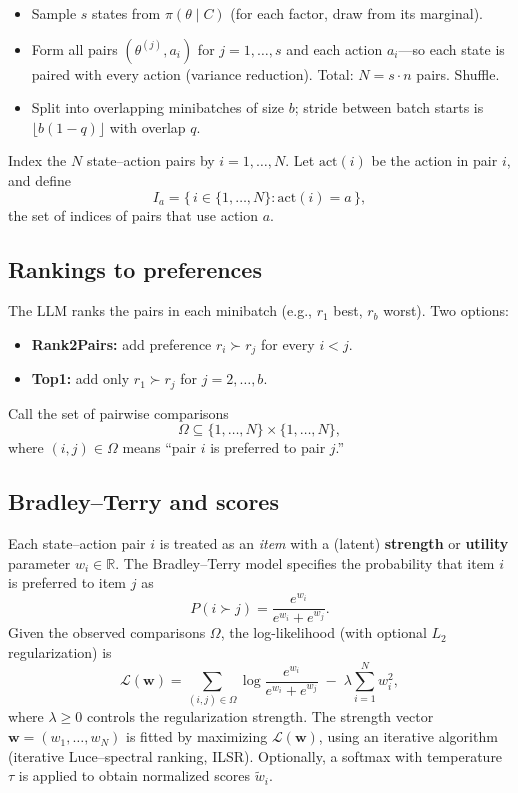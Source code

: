 \documentclass[11pt]{article}
\begin{document}
\begin{itemize}[leftmargin=*]
\item Sample $s$ states from $\pi(\theta\mid C)$ (for each factor, draw from its marginal).
\item Form all pairs $(\theta^{(j)}, a_i)$ for $j=1,\ldots,s$ and each action $a_i$---so each state is paired with every action (variance reduction). Total: $N = s \cdot n$ pairs. Shuffle.
\item Split into overlapping minibatches of size $b$; stride between batch starts is $\lfloor b(1-q) \rfloor$ with overlap $q$.
\end{itemize}

Index the $N$ state--action pairs by $i = 1,\ldots,N$. Let $\text{act}(i)$ be the action in pair $i$, and define
\[
I_a = \{\, i \in \{1,\ldots,N\} : \text{act}(i) = a \,\},
\]
the set of indices of pairs that use action $a$.

\subsection{Rankings to preferences}

The LLM ranks the pairs in each minibatch (e.g., $r_1$ best, $r_b$ worst). Two options:
\begin{itemize}[leftmargin=*]
\item \textbf{Rank2Pairs:} add preference $r_i \succ r_j$ for every $i < j$.
\item \textbf{Top1:} add only $r_1 \succ r_j$ for $j=2,\ldots,b$.
\end{itemize}
Call the set of pairwise comparisons
\[
\Omega \subseteq \{1,\ldots,N\} \times \{1,\ldots,N\},
\]
where $(i,j) \in \Omega$ means ``pair $i$ is preferred to pair $j$.''

\subsection{Bradley--Terry and scores}

Each state--action pair $i$ is treated as an \emph{item} with a (latent) \textbf{strength} or \textbf{utility} parameter $w_i \in \mathbb{R}$. The Bradley--Terry model specifies the probability that item $i$ is preferred to item $j$ as
\begin{equation}\label{eq:BT}
P(i \succ j) = \frac{e^{w_i}}{e^{w_i} + e^{w_j}}.
\end{equation}
Given the observed comparisons $\Omega$, the log-likelihood (with optional $L_2$ regularization) is
\begin{equation}\label{eq:BT_ll}
\mathcal{L}(\mathbf{w})
= \sum_{(i,j) \in \Omega} \log \frac{e^{w_i}}{e^{w_i} + e^{w_j}}
 \;-\; \lambda \sum_{i=1}^{N} w_i^2,
\end{equation}
where $\lambda \ge 0$ controls the regularization strength. The strength vector $\mathbf{w} = (w_1,\ldots,w_N)$ is fitted by maximizing $\mathcal{L}(\mathbf{w})$, using an iterative algorithm (iterative Luce--spectral ranking, ILSR). Optionally, a softmax with temperature $\tau$ is applied to obtain normalized scores $\tilde{w}_i$.
\end{document}
